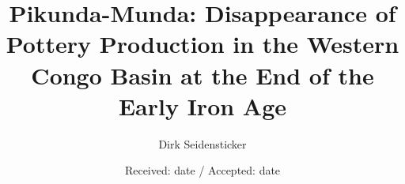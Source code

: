 \documentclass[smallextended,natbib]{svjour3}       %
\begin{document}
	
\title{Pikunda-Munda: Disappearance of Pottery Production in the Western Congo Basin at the End of the Early Iron Age}

\author{Dirk Seidensticker}


\date{Received: date / Accepted: date}

\maketitle
\end{document}
